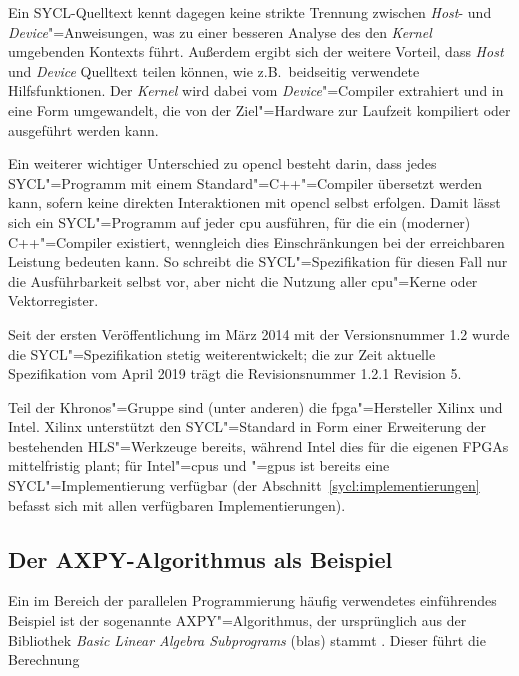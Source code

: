 Ein SYCL-Quelltext kennt dagegen keine strikte Trennung zwischen \textit{Host}-
und \textit{Device}"=Anweisungen, was zu einer besseren Analyse des den
\textit{Kernel} umgebenden Kontexts führt. Außerdem ergibt sich der weitere
Vorteil, dass \textit{Host} und \textit{Device} Quelltext teilen können, wie
z.B.\ beidseitig verwendete Hilfsfunktionen. Der \textit{Kernel} wird dabei vom
\textit{Device}"=Compiler extrahiert und in eine Form umgewandelt, die von der
Ziel"=Hardware zur Laufzeit kompiliert oder ausgeführt werden kann.
\cite[vgl][35]{sycl2019}

Ein weiterer wichtiger Unterschied zu \gls{opencl} besteht darin, dass
jedes SYCL"=Programm mit einem Standard"=C++"=Compiler übersetzt werden kann,
sofern keine direkten Interaktionen mit \gls{opencl} selbst erfolgen. Damit
lässt sich ein SYCL"=Programm auf jeder \gls{cpu} ausführen, für die ein
(moderner) C++"=Compiler existiert, wenngleich dies Einschränkungen bei der
erreichbaren Leistung bedeuten kann. So schreibt die SYCL"=Spezifikation für
diesen Fall nur die Ausführbarkeit selbst vor, aber nicht die Nutzung aller
\gls{cpu}"=Kerne oder Vektorregister. \cite[vgl.][15]{sycl2019}

Seit der ersten Veröffentlichung im März 2014 \cite[vgl.][]{khronos2014} mit der
Versionsnummer 1.2 wurde die SYCL"=Spezifikation stetig weiterentwickelt; die
zur Zeit aktuelle Spezifikation vom April 2019 trägt die Revisionsnummer 1.2.1
Revision 5. \cite[vgl.][1]{sycl2019}

Teil der Khronos"=Gruppe sind (unter anderen) die \gls{fpga}"=Hersteller Xilinx
und Intel. Xilinx unterstützt den SYCL"=Standard in Form einer Erweiterung der
bestehenden HLS"=Werkzeuge bereits, während Intel dies für die eigenen FPGAs
mittelfristig plant; für Intel"=\gls{cpu}s und "=\gls{gpu}s ist bereits eine
SYCL"=Implementierung verfügbar (der Abschnitt~\ref{sycl:implementierungen}
befasst sich mit allen verfügbaren Implementierungen).

\subsection{Der AXPY-Algorithmus als Beispiel}
\label{sycl:ueberblick:axpy}

Ein im Bereich der parallelen Programmierung häufig verwendetes einführendes
Beispiel ist der sogenannte AXPY"=Algorithmus, der ursprünglich aus der
Bibliothek \textit{Basic Linear Algebra Subprograms} (\gls{blas}) stammt
\cite[vgl.][]{lawson1979}. Dieser führt die Berechnung

